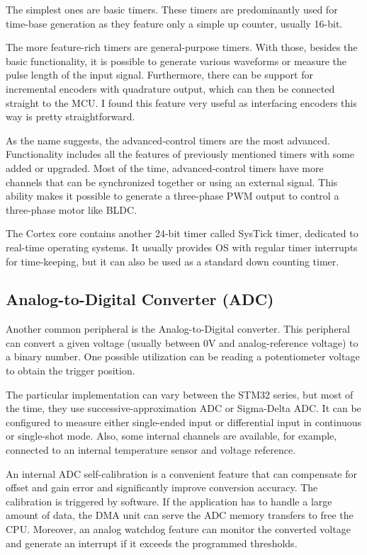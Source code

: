 The simplest ones are basic timers. These timers are predominantly used for time-base generation as they feature only a simple up counter, usually 16-bit.

The more feature-rich timers are general-purpose timers. With those, besides the basic functionality, it is possible to generate various waveforms or measure the pulse length of the input signal. Furthermore, there can be support for incremental encoders with quadrature output, which can then be connected straight to the MCU. I found this feature very useful as interfacing encoders this way is pretty straightforward.

As the name suggests, the advanced-control timers are the most advanced. Functionality includes all the features of previously mentioned timers with some added or upgraded. Most of the time, advanced-control timers have more channels that can be synchronized together or using an external signal. This ability makes it possible to generate a three-phase PWM output to control a three-phase motor like BLDC.

The Cortex core contains another 24-bit timer called SysTick timer, dedicated to real-time operating systems. It usually provides OS with regular timer interrupts for time-keeping, but it can also be used as a standard down counting timer.

	\subsection{Analog-to-Digital Converter (ADC)}
	\label{sub:adc}
Another common peripheral is the Analog-to-Digital converter. This peripheral can convert a given voltage (usually between 0V and analog-reference voltage) to a binary number. One possible utilization can be reading a potentiometer voltage to obtain the trigger position.

The particular implementation can vary between the STM32 series, but most of the time, they use successive-approximation ADC or Sigma-Delta ADC. It can be configured to measure either single-ended input or differential input in continuous or single-shot mode. Also, some internal channels are available, for example, connected to an internal temperature sensor and voltage reference.

An internal ADC self-calibration is a convenient feature that can compensate for offset and gain error and significantly improve conversion accuracy. The calibration is triggered by software. If the application has to handle a large amount of data, the DMA unit can serve the ADC memory transfers to free the CPU. Moreover, an analog watchdog feature can monitor the converted voltage and generate an interrupt if it exceeds the programmed thresholds. 

